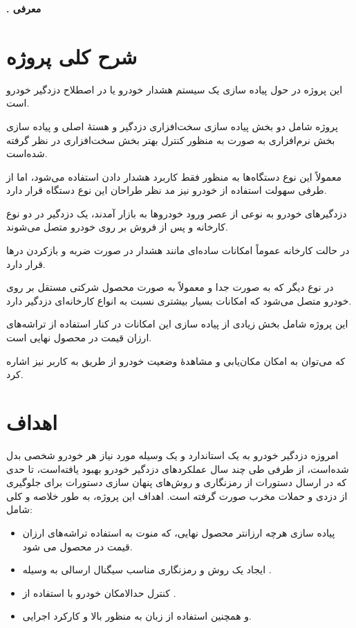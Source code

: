 \documentclass[a4paper,12pt]{report}
\newcommand{\opchapter}[1]{\newpage%
	\topskip0pt%
	\vspace*{\fill}%
	\addtocounter{chapter}{1}%
	\begin{center}%
		\textbf{\huge{\color{gray}{فصل \thechapter \\[1cm] \uppercase{#1}}}}%
	\end{center}%
	\vspace*{\fill}%
	\newpage%
	\textbf{\Large{\thechapter. #1}}%
	\addcontentsline{toc}{chapter}{#1}%
}
\begin{document}
	\maketitle
	\setcounter{page}{1}
	\tableofcontents
	\listoffigures

	\newpage

	\opchapter{
	معرفی
	}\label{chap1}

	\section{
	شرح کلی پروژه
	}\label{sec1:chap1}
	این پروژه در حول پیاده سازی یک سیستم هشدار خودرو یا در اصطلاح دزدگیر خودرو است.

	پروژه شامل دو بخش پیاده سازی سخت‌افزاری دزدگیر و هستهٔ اصلی و پیاده سازی بخش نرم‌افزاری به صورت
	به منظور کنترل بهتر بخش سخت‌افزاری در نظر گرفته شده‌است.

	معمولاً این نوع دستگاه‌ها به منظور فقط کاربرد هشدار دادن استفاده می‌شود، اما از طرفی سهولت استفاده از خودرو نیز مد نظر طراحان این نوع دستگاه قرار دارد.

	دزدگیر‌های خودرو به نوعی از عصر ورود خودروها به بازار آمدند، یک دزدگیر در دو نوع کارخانه و پس از فروش بر روی خودرو متصل می‌شوند.

	در حالت کارخانه عموماً امکانات ساده‌ای مانند هشدار در صورت ضربه و بازکردن درها قرار دارد.

	در نوع دیگر که به صورت جدا و معمولاً به صورت محصول شرکتی مستقل بر روی خودرو متصل می‌شود که امکانات بسیار بیشتری نسبت به انواع کارخانه‌ای دزدگیر دارد.

	این پروژه شامل بخش زیادی از پیاده سازی این امکانات در کنار استفاده از تراشه‌های ارزان قیمت در محصول نهایی است.

	که می‌توان به امکان مکان‌یابی و مشاهدهٔ وضعیت خودرو از طریق
	به کاربر نیز اشاره کرد.


	\section{
	اهداف
	}\label{sec2:chap1}
	امروزه دزدگیر خودرو به یک استاندارد و یک وسیله مورد نیاز هر خودرو شخصی بدل شده‌است،
	از طرفی طی چند سال عملکرد‌های دزدگیر خودرو بهبود یافته‌است،‌ تا حدی که در ارسال دستورات
	از رمزنگاری و روش‌های پنهان سازی دستورات برای جلوگیری از دزدی و حملات مخرب صورت گرفته است.
	اهداف این پروژه، به طور خلاصه و کلی شامل:
	\begin{itemize}[nosep]
		\item
		پیاده سازی هرچه ارزانتر محصول نهایی، که منوت به استفاده تراشه‌های ارزان قیمت در محصول می شود.
		\item
		ایجاد یک روش و رمزنگاری مناسب سیگنال ارسالی به وسیله
		.
		\item
		کنترل حدالامکان خودرو با استفاده از
		.
		\item
		و همچنین استفاده از زبان
		به منظور
		بالا و کارکرد اجرایی.
	\end{itemize}
\end{document}
